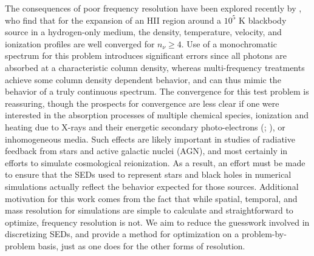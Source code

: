 \documentclass[preprint2]{aastex}              %
\begin{document}
The consequences of poor frequency resolution have been explored recently by \cite{Wise2011}, who find that for the expansion of an HII region around a $10^5$ K blackbody source in a hydrogen-only medium, the density, temperature, velocity, and ionization profiles are well converged for $n_{\nu} \ge 4$.  Use of a monochromatic spectrum for this problem introduces significant errors since all photons are absorbed at a characteristic column density, whereas multi-frequency treatments achieve some column density dependent behavior, and can thus mimic the behavior of a truly continuous spectrum.  The convergence for this test problem is reassuring, though the prospects for convergence are less clear if one were interested in the absorption processes of multiple chemical species, ionization and heating due to X-rays and their energetic secondary photo-electrons (\cite{Shull1985}; \cite{Furlanetto2010}), or inhomogeneous media.  Such effects are likely important in studies of radiative feedback from stars and active galactic nuclei (AGN), and most certainly in efforts to simulate cosmological reionization.  As a result, an effort must be made to ensure that the SEDs used to represent stars and black holes in numerical simulations actually reflect the behavior expected for those sources.  Additional motivation for this work comes from the fact that while spatial, temporal, and mass resolution for simulations are simple to calculate and straightforward to optimize, frequency resolution is not.  We aim to reduce the guesswork involved in discretizing SEDs, and provide a method for optimization on a problem-by-problem basis, just as one does for the other forms of resolution.
\end{document}
